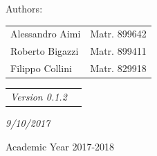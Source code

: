 \documentclass[a4paper,12pt,twoside]{report}
\begin{document}
\begin{center}
\begin{center}
\vspace{10mm}
Authors:
\vspace{-3mm}
\end{center}
\begin{center}
\begin{tabular}{l l }
Alessandro Aimi & Matr. 899642 \\
Roberto Bigazzi & Matr. 899411 \\
Filippo Collini & Matr. 829918
\end{tabular}
\end{center}
\vspace{10mm}

\begin{center}
\begin{tabular}{l l }
\it{Version 0.1.2} \\
\end{tabular}
\end{center}
\begin{center}
\vspace{-4mm}
\it{9/10/2017}
\end{center}
\vspace{-4mm}
{\large{Academic Year 2017-2018}}
\end{center}

\end{document}
